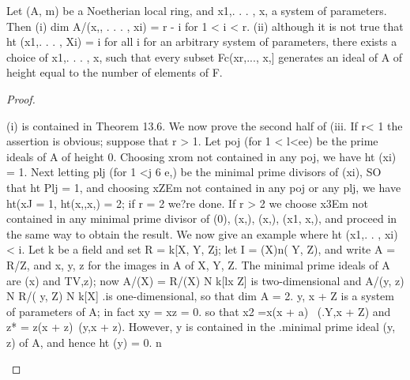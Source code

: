 \begin{theorem}[Theorem 14.1]\label{mcrt-auto-theorem-14-1}
\begin{mathematicalrecord}
Let (A, m) be a Noetherian local ring, and x1,. . . , x, a system
  of parameters. Then
      (i) dim A/(x,, . . . , xi) = r - i for 1 < i < r.
      (ii) although it is not true that ht (x1,. . . , Xi) = i for all i for an arbitrary
  system of parameters, there exists a choice of x1,. . . , x, such that every
  subset Fc(xr,...,          x,] generates an ideal of A of height equal to the
 number of elements of F.
\end{mathematicalrecord}
\end{theorem}
\begin{proof}
\begin{mathematicalrecord}
(i) is contained in Theorem 13.6. We now prove the second half of
 (iii. If r< 1 the assertion is obvious; suppose that r > 1. Let poj (for 1 <
l<ee) be the prime ideals of A of height 0. Choosing xrom not contained
 in any poj, we have ht (xi) = 1. Next letting plj (for 1 <j 6 e,) be the minimal
 prime divisors of (xi), SO that ht Plj = 1, and choosing xZEm not contained
 in any poj or any plj, we have ht(xJ = 1, ht(x,,x,) = 2; if r = 2 we?re
 done. If r > 2 we choose x3Em not contained in any minimal prime
 divisor of (0), (x,), (x,), (x1, x,), and proceed in the same way to obtain
 the result.
      We now give an example where ht (x1,. . , xi) < i. Let k be a field and
 set R = k[X, Y, Zj; let I = (X)n( Y, Z), and write A = R/Z, and x, y, z for
 the images in A of X, Y, Z. The minimal prime ideals of A are (x) and
 TV,z); now A/(X) = R/(X) N k[lx Z] is two-dimensional                    and A/(y, z) N
 R/( y, Z) N k[X]      .is one-dimensional,    so that dim A = 2. {y, x + Z} is a
 system of parameters of A; in fact xy = xz = 0. so that x2 =x(x + a)~
(.Y,x + Z) and z* = z(x + z)~(y,x + z). However, y is contained in the
.minimal prime ideal (y, z) of A, and hence ht (y) = 0. n
\end{mathematicalrecord}
\end{proof}


